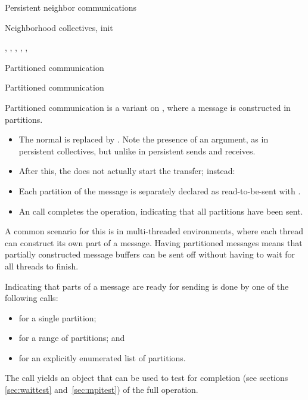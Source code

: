  {Persistent neighbor communications}

\begin{mpifournote}{Neighborhood collectives, init}

  \begin{raggedlist} %
    ,
    ,
    ,
    ,
    ,
  \end{raggedlist} %

\end{mpifournote}

 {Partitioned communication}
\begin{mpifournote}{Partitioned communication}
\label{sec:psend}

Partitioned communication is a variant
on ,
where a message is constructed in partitions.
\begin{itemize}
\item The normal  is replaced
  by .
  Note the presence of an  argument,
  as in persistent collectives, but unlike in persistent sends and receives.
\item After this, the  does not
  actually start the transfer; instead:
\item Each partition of the message is separately
  declared as read-to-be-sent with .
\item An  call completes the operation,
  indicating that all partitions have been sent.
\end{itemize}
A common scenario for this is in multi-threaded environments,
where each thread can construct its own part of a message.
Having partitioned messages means that partially constructed message buffers
can be sent off without having to wait for all threads to finish.

Indicating that parts of a message are ready for sending
is done by one of the following calls:
\begin{itemize}
\item {} for a single partition;
\item {} for a range of partitions; and
\item {} for an explicitly enumerated list of partitions.
\end{itemize}
The  call yields an  object
that can be used to test for completion
(see sections \ref{sec:waittest} and~\ref{sec:mpitest})
of the full operation.


\end{mpifournote}
